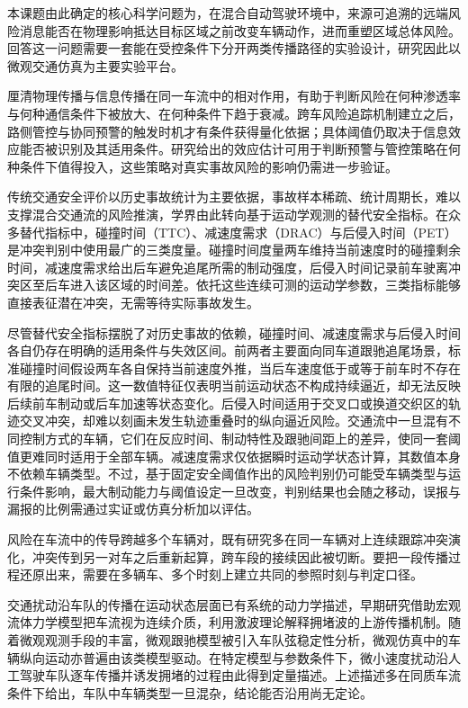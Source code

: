 \documentclass[oneside,doctype=proposal,fontset=windows,times=true]{tongjithesis}
\begin{document}
\begin{tjformbody}
本课题由此确定的核心科学问题为，在混合自动驾驶环境中，来源可追溯的远端风险消息能否在物理影响抵达目标区域之前改变车辆动作，进而重塑区域总体风险。回答这一问题需要一套能在受控条件下分开两类传播路径的实验设计，研究因此以微观交通仿真为主要实验平台。

厘清物理传播与信息传播在同一车流中的相对作用，有助于判断风险在何种渗透率与何种通信条件下被放大、在何种条件下趋于衰减。跨车风险追踪机制建立之后，路侧管控与协同预警的触发时机才有条件获得量化依据；具体阈值仍取决于信息效应能否被识别及其适用条件。研究给出的效应估计可用于判断预警与管控策略在何种条件下值得投入，这些策略对真实事故风险的影响仍需进一步验证。
\end{tjformbody}

%
\begin{tjformbody}
传统交通安全评价以历史事故统计为主要依据，事故样本稀疏、统计周期长，难以支撑混合交通流的风险推演，学界由此转向基于运动学观测的替代安全指标。在众多替代指标中，碰撞时间（TTC）、减速度需求（DRAC）与后侵入时间（PET）是冲突判别中使用最广的三类度量\cite{minderhoud2001}\cite{tarko2018}\cite{arun2021}。碰撞时间度量两车维持当前速度时的碰撞剩余时间，减速度需求给出后车避免追尾所需的制动强度，后侵入时间记录前车驶离冲突区至后车进入该区域的时间差。依托这些连续可测的运动学参数，三类指标能够直接表征潜在冲突，无需等待实际事故发生。

尽管替代安全指标摆脱了对历史事故的依赖，碰撞时间、减速度需求与后侵入时间各自仍存在明确的适用条件与失效区间。前两者主要面向同车道跟驰追尾场景，标准碰撞时间假设两车各自保持当前速度外推，当后车速度低于或等于前车时不存在有限的追尾时间。这一数值特征仅表明当前运动状态不构成持续逼近，却无法反映后续前车制动或后车加速等状态变化。后侵入时间适用于交叉口或换道交织区的轨迹交叉冲突，却难以刻画未发生轨迹重叠时的纵向逼近风险\cite{arun2021}\cite{wang2021}。交通流中一旦混有不同控制方式的车辆，它们在反应时间、制动特性及跟驰间距上的差异，使同一套阈值更难同时适用于全部车辆。减速度需求仅依据瞬时运动学状态计算，其数值本身不依赖车辆类型。不过，基于固定安全阈值作出的风险判别仍可能受车辆类型与运行条件影响，最大制动能力与阈值设定一旦改变，判别结果也会随之移动，误报与漏报的比例需通过实证或仿真分析加以评估\cite{wang2021}\cite{fu2021}。

风险在车流中的传导跨越多个车辆对，既有研究多在同一车辆对上连续跟踪冲突演化，冲突传到另一对车之后重新起算\cite{li2014}，跨车段的接续因此被切断。要把一段传播过程还原出来，需要在多辆车、多个时刻上建立共同的参照时刻与判定口径。

%
交通扰动沿车队的传播在运动状态层面已有系统的动力学描述，早期研究借助宏观流体力学模型把车流视为连续介质，利用激波理论解释拥堵波的上游传播机制\cite{lighthill1955}\cite{richards1956}。随着微观观测手段的丰富，微观跟驰模型被引入车队弦稳定性分析\cite{newell1993}，微观仿真中的车辆纵向运动亦普遍由该类模型驱动\cite{treiber2000}。在特定模型与参数条件下，微小速度扰动沿人工驾驶车队逐车传播并诱发拥堵的过程由此得到定量描述。上述描述多在同质车流条件下给出，车队中车辆类型一旦混杂，结论能否沿用尚无定论。


\end{tjformbody}
\end{document}
